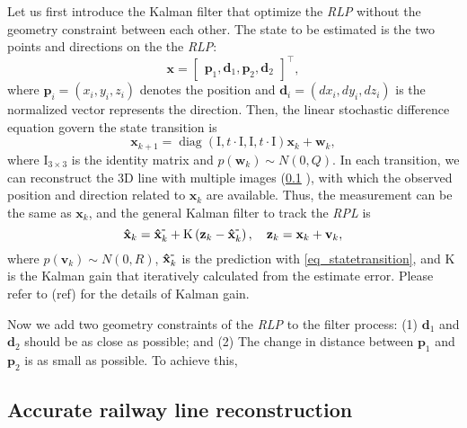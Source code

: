 Let us first introduce the Kalman filter that optimize the \textit{RLP} without the geometry constraint between each other.
The state to be estimated is the two points and directions on the the \textit{RLP}:
\begin{equation}
\mathbf{x} = \begin{bmatrix}
    \mathbf p_1,\mathbf d_1,\mathbf p_2,\mathbf d_2 
\end{bmatrix}^ \top,
\end{equation}
where $\mathbf p_i=\left(x_i, y_i, z_i\right)$ denotes the position 
and $\mathbf d_i=\left(dx_i, dy_i, dz_i\right)$ is the normalized vector represents the direction.
Then,
the linear stochastic difference equation govern the state transition is
\begin{equation}
        \mathbf{x}_{k+1}= 
        \operatorname{diag} \left(\mathrm I,t \! \cdot \! \mathrm I, \mathrm I, t \! \cdot \! \mathrm I \right) \mathbf{x}_{k} + \mathbf{w}_k,
        \label {eq_statetransition}
\end{equation}
where $\mathrm I_{3\times3}$ is the identity matrix and $p \left(\mathbf w_k \right) \sim N(0, Q)$.
In each transition,
we can reconstruct the 3D line with multiple images (\cref*{sec_linereconstruction} ),
with which the observed position and direction related to $\mathbf x_k$ are available.
Thus,
the measurement can be the same as $\mathbf x_k$,
and the general Kalman filter to track the \textit{RPL} is
\begin{equation}
    \mathbf {\hat x}_k =\mathbf {\hat x}_k^{\mbox -}+ \mathrm K\left(\mathbf z_k - \mathbf {\hat x}_k^{\mbox -}\right),\quad
    \mathbf z_k = \mathbf x_k+ \mathbf v_k,
\end{equation}
where $p \left(\mathbf v_k \right) \sim N(0, R)$,
$\mathbf {\hat x}_k^{\mbox -}$ is the prediction with \cref{eq_statetransition},
and $\mathrm K$ is the Kalman gain that iteratively calculated from the estimate error.
Please refer to (ref) for the details of Kalman gain. 

Now we add two geometry constraints of the \textit{RLP} to the filter process:
(1) $\mathbf d_1$ and $\mathbf d_2$ should be as close as possible;
and (2) The change in distance between $\mathbf p_1$ and $\mathbf p_2$ is as small as possible.
To achieve this,

\subsection{Accurate railway line reconstruction}
\label{sec_linereconstruction}


